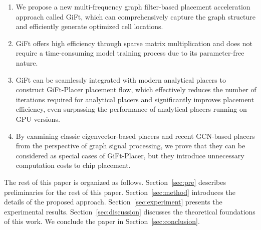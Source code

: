 \begin{enumerate}


\item We propose a new multi-frequency graph filter-based placement acceleration approach called GiFt, which can comprehensively capture the graph structure and efficiently generate optimized cell locations. 

\item GiFt offers high efficiency through sparse matrix multiplication and does not require a time-consuming model training process due to its parameter-free nature.

\item GiFt can be seamlessly integrated with modern analytical placers to construct GiFt-Placer placement flow, which effectively reduces the number of iterations required for analytical placers and significantly improves placement efficiency, even surpassing the performance of analytical placers running on GPU versions.

\item By examining classic eigenvector-based placers and recent GCN-based placers from the perspective of graph signal processing, we prove that they can be considered as special cases of GiFt-Placer, but they introduce unnecessary computation costs to chip placement.


\end{enumerate}

The rest of this paper is organized as follows.  Section~\ref{sec:pre} describes preliminaries for the rest of this paper. Section~\ref{sec:method} introduces the details of the proposed approach. Section~\ref{sec:experiment} presents the experimental results. Section~\ref{sec:discussion} discusses the theoretical foundations of this work. We conclude the paper in Section~\ref{sec:conclusion}.

